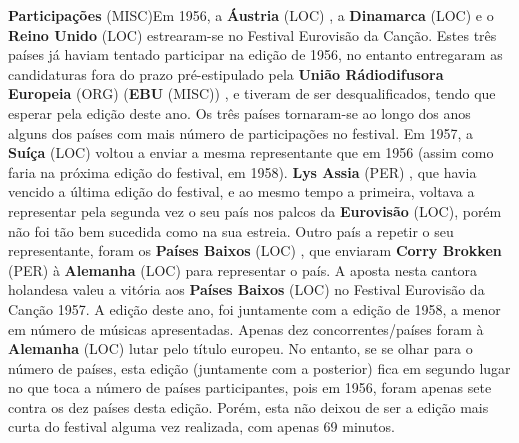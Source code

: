 \documentclass[12pt,a4paper]{article}
\begin{document}
\textbf{Participações} (MISC)Em 1956, a \textbf{Áustria} (LOC) , a \textbf{Dinamarca} (LOC) e o \textbf{Reino Unido} (LOC) estrearam-se no Festival Eurovisão da Canção. Estes três países já haviam tentado participar na edição de 1956, no entanto entregaram as candidaturas fora do prazo pré-estipulado pela \textbf{União Rádiodifusora Europeia} (ORG) (\textbf{EBU} (MISC)) , e tiveram de ser desqualificados, tendo que esperar pela edição deste ano. Os três países tornaram-se ao longo dos anos alguns dos países com mais número de participações no festival. Em 1957, a \textbf{Suíça} (LOC) voltou a enviar a mesma representante que em 1956 (assim como faria na próxima edição do festival, em 1958). \textbf{Lys Assia} (PER) , que havia vencido a última edição do festival, e ao mesmo tempo a primeira, voltava a representar pela segunda vez o seu país nos palcos da \textbf{Eurovisão} (LOC), porém não foi tão bem sucedida como na sua estreia. Outro país a repetir o seu representante, foram os \textbf{Países Baixos} (LOC) , que enviaram \textbf{Corry Brokken} (PER) à \textbf{Alemanha} (LOC) para representar o país. A aposta nesta cantora holandesa valeu a vitória aos \textbf{Países Baixos} (LOC) no Festival Eurovisão da Canção 1957. A edição deste ano, foi juntamente com a edição de 1958, a menor em número de músicas apresentadas. Apenas dez concorrentes/países foram à \textbf{Alemanha} (LOC) lutar pelo título europeu. No entanto, se se olhar para o número de países, esta edição (juntamente com a posterior) fica em segundo lugar no que toca a número de países participantes, pois em 1956, foram apenas sete contra os dez países desta edição. Porém, esta não deixou de ser a edição mais curta do festival alguma vez realizada, com apenas 69 minutos.
\end{document}
